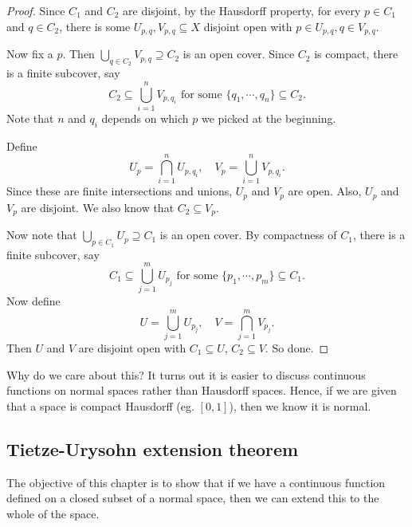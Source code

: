 \documentclass[a4paper]{article}
\begin{document}
\begin{proof}
  Since $C_1$ and $C_2$ are disjoint, by the Hausdorff property, for every $p \in C_1$ and $q \in C_2$, there is some $U_{p, q}, V_{p, q}\subseteq X$ disjoint open with $p \in U_{p, q}, q \in V_{p, q}$.

  Now fix a $p$. Then $\bigcup_{q \in C_2}V_{p, q}\supseteq C_2$ is an open cover. Since $C_2$ is compact, there is a finite subcover, say
  \[
    C_2 \subseteq \bigcup_{i = 1}^n V_{p, q_i}\text{ for some }\{q_1,\cdots, q_n\}\subseteq C_2.
  \]
  Note that $n$ and $q_i$ depends on which $p$ we picked at the beginning.

  Define
  \[
    U_p = \bigcap_{i=1}^n U_{p, q_i},\quad V_p = \bigcup_{i = 1}^n V_{p, q_i}.
  \]
  Since these are finite intersections and unions, $U_p$ and $V_p$ are open. Also, $U_p$ and $V_p$ are disjoint. We also know that $C_2 \subseteq V_p$.

  Now note that $\bigcup_{p \in C_1} U_p \supseteq C_1$ is an open cover. By compactness of $C_1$, there is a finite subcover, say
  \[
    C_1 \subseteq \bigcup_{j = 1}^m U_{p_j}\text{ for some }\{p_1, \cdots, p_m\}\subseteq C_1.
  \]
  Now define
  \[
    U = \bigcup_{j = 1}^m U_{p_j},\quad V = \bigcap_{j = 1}^m V_{p_j}.
  \]
  Then $U$ and $V$ are disjoint open with $C_1 \subseteq U$, $C_2 \subseteq V$. So done.
\end{proof}
Why do we care about this? It turns out it is easier to discuss continuous functions on normal spaces rather than Hausdorff spaces. Hence, if we are given that a space is compact Hausdorff (eg. $[0, 1]$), then we know it is normal.

\subsection{Tietze-Urysohn extension theorem}
The objective of this chapter is to show that if we have a continuous function defined on a closed subset of a normal space, then we can extend this to the whole of the space.
\end{document}
